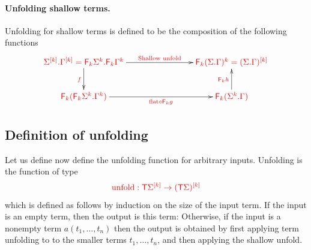\paragraph*{Unfolding shallow terms.} Unfolding for shallow terms is defined to be  the composition of the following functions
  \begin{align*}
  \xymatrix@C=2.8cm{
          \ranked{\shallowterm{\mati k \rSigma} {\mati k \rGamma} = {\shallowterm{\reduce k {\Sigma^k}}{\reduce k {\Gamma^k}}} 
        \ar[d]_{\ranked{\substack{f}}}
        \ar[r]^-{\ranked{\text{Shallow unfold}}}}
        &
        \ranked{ \reduce k(\shallowterm{\Sigma}{ {\Gamma}})^k = \mati k {(\shallowterm \Sigma \Gamma)}}
        \\
       \ranked{  \reduce k(\shallowterm{\reduce k {\Sigma^k}}{ {\Gamma^k}})}
        \ar[r]_-{\ranked{\flatt\circ \reduce k g}}
        &
    \ranked{   \reduce k(\shallowterm{\Sigma^k}{ {\Gamma}}) } \ar[u]^{\ranked{\reduce k  h}}
    } 
\end{align*}    

\subsection{Definition of unfolding}
Let us define now define the unfolding function for arbitrary inputs.
Unfolding is the function of type 
\begin{align*}
    \ranked{\unfold : \tmonad \mati k \rSigma \to \mati k {(\tmonad \Sigma)} }
    \end{align*}
    which  is defined as follows by induction on the size of the input term. If the input is an empty term, then the output is this term:
Otherwise, if the input is a nonempty term $a(t_1,\ldots,t_n)$ then the output is obtained by first applying term unfolding to to the smaller terms $t_1,\ldots,t_n$, and then applying the shallow unfold. 